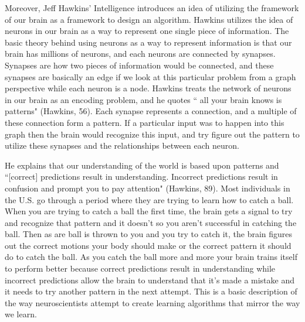 \documentclass[11pt, oneside]{article}
\begin{document}
\par Moreover, Jeff Hawkins' Intelligence introduces an idea of utilizing the framework of our brain as a framework to design an algorithm. Hawkins utilizes the idea of neurons in our brain as a way to represent one single piece of information. The basic theory behind using neurons as a way to represent information is that our brain has millions of neurons, and each neurons are connected by synapses. Synapses are how two pieces of information would be connected, and these synapses are basically an edge if we look at this particular problem from a graph perspective while each neuron is a node. Hawkins treats the network of neurons in our brain as an encoding problem, and he quotes `` all your brain knows is patterns" (Hawkins, 56). Each synapse represents a connection, and a multiple of these connection form a pattern. If a particular input was to happen into this graph then the brain would recognize this input, and try figure out the pattern to utilize these synapses and the relationships between each neuron. 

\par He explains that our understanding of the world is based upon patterns and ``[correct] predictions result in understanding. Incorrect predictions result in confusion and prompt you to pay attention" (Hawkins, 89). Most individuals in the U.S. go through a period where they are trying to learn how to catch a ball. When you are trying to catch a ball the first time, the brain gets a signal to try and recognize that pattern and it doesn't so you aren't successful in catching the ball. Then as are ball is thrown to you and you try to catch it, the brain figures out the correct motions your body should make or the correct pattern it should do to catch the ball. As you catch the ball more and more your brain trains itself to perform better because correct predictions result in understanding while incorrect predictions allow the brain to understand that it's made a mistake and it needs to try another pattern in the next attempt. This is a basic description of the way neuroscientists attempt to create learning algorithms that mirror the way we learn.
\end{document}
